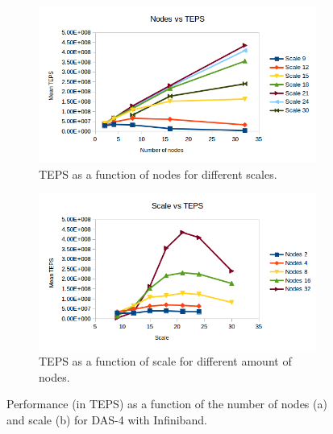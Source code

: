 \begin{figure}[!h]
\centering
\begin{subfigure}{.5\textwidth}
  \centering
  \includegraphics[width=\linewidth]{images/nodes_no_val.png}
  \caption{TEPS as a function of nodes for different scales.}
  \label{fig:nodes_no_val}
\end{subfigure}%
\begin{subfigure}{.5\textwidth}
  \centering
  \includegraphics[width=\linewidth]{images/scale_no_val.png}
  \caption{TEPS as a function of scale for different amount of nodes.}
  \label{fig:scale_no_val}
\end{subfigure}
\caption{Performance (in TEPS) as a function of the number of nodes (a) and scale (b) for DAS-4 with Infiniband.}
\label{fig:das_no_val}
\end{figure}

